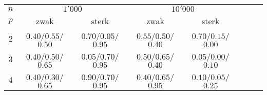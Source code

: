 \begin{tabular}{cccccccc}
\toprule
$n$&\multicolumn{2}{c}{$1'000$}&\multicolumn{2}{c}{$10'000$}\\
$p$&zwak&sterk&zwak&sterk\\\midrule
$2$&$0.40$/$0.55$/$0.50$&$0.70$/$0.05$/$0.95$&$0.55$/$0.50$/$0.40$&$0.70$/$0.15$/$0.00$\\
$3$&$0.40$/$0.50$/$0.65$&$0.05$/$0.70$/$0.95$&$0.50$/$0.65$/$0.40$&$0.05$/$0.00$/$0.10$\\
$4$&$0.40$/$0.30$/$0.65$&$0.90$/$0.70$/$0.95$&$0.40$/$0.65$/$0.95$&$0.10$/$0.05$/$0.25$\\
\bottomrule
\end{tabular}